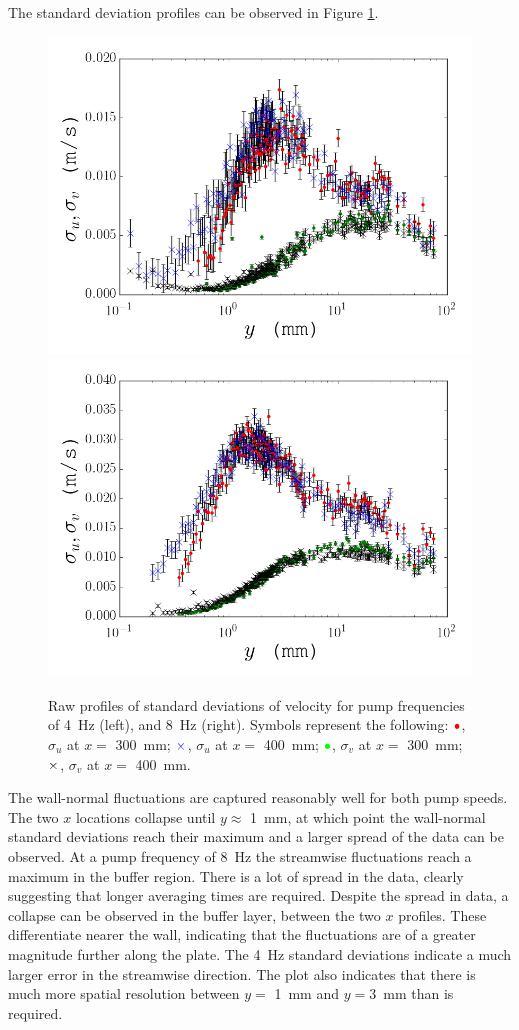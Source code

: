 \documentclass[12pt,oneside,a4paper]{article}
\begin{document}
The standard deviation profiles can be observed in Figure \ref{figure:experiments:profiles:std}.
%
\begin{figure}[!t]
\centering
\includegraphics[width=0.5\linewidth]{images/LDA_profileImages/std_4hz.png}\hfill
\includegraphics[width=0.5\linewidth]{images/LDA_profileImages/std_8hz.png}
\caption{Raw profiles of standard deviations of velocity for pump frequencies of \SI{4}{Hz} (left), and \SI{8}{Hz} (right). Symbols represent the following: $\color{red}{\bullet}$, $\sigma_u$ at $x=$ \SI{300}{mm}; $\color{blue} \times $, $\sigma_u$ at $x=$ \SI{400}{mm}; $\color{green}{\bullet}$, $\sigma_v$ at $x=$ \SI{300}{mm}; $\color{black} \times $, $\sigma_v$ at $x=$ \SI{400}{mm}.}
\label{figure:experiments:profiles:std}
\end{figure}
%
The wall-normal fluctuations are captured reasonably well for both pump speeds. The two $x$ locations collapse until $y\approx$ \SI{1}{mm}, at which point the wall-normal standard deviations reach their maximum and a larger spread of the data can be observed. At a pump frequency of \SI{8}{Hz} the streamwise fluctuations reach a maximum in the buffer region. There is a lot of spread in the data, clearly suggesting that longer averaging times are required. Despite the spread in data, a collapse can be observed in the buffer layer, between the two $x$ profiles. These differentiate nearer the wall, indicating that the fluctuations are of a greater magnitude further along the plate. The \SI{4}{Hz} standard deviations indicate a much larger error in the streamwise direction.  The plot also indicates that there is much more spatial resolution between $y=$ \SI{1}{mm} and $y=$\SI{3}{mm} than is required. 
\end{document}
